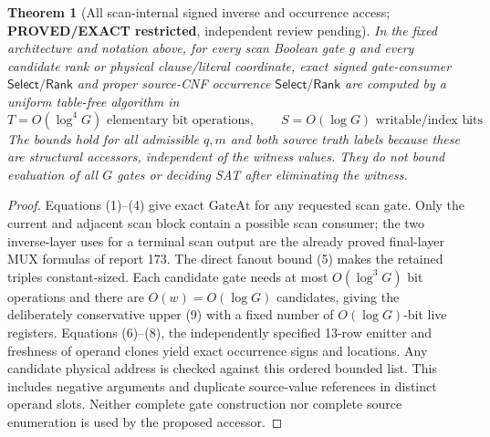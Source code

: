 \documentclass[11pt]{article}
\newtheorem{theorem}{Theorem}
\newcommand{\Select}{\mathsf{Select}}
\newcommand{\Rank}{\mathsf{Rank}}
\begin{document}
\begin{theorem}[All scan-internal signed inverse and occurrence access; \textbf{PROVED/EXACT restricted}, independent review pending]
In the fixed architecture and notation above, for every scan Boolean gate $g$ and every candidate rank or physical clause/literal coordinate, exact signed gate-consumer $\Select/\Rank$ and proper source-CNF occurrence $\Select/\Rank$ are computed by a uniform table-free algorithm in
\[
\boxed{T=O(\log^4G)\text{ elementary bit operations},\qquad
S=O(\log G)\text{ writable/index bits}}.\tag{9}
\]
The bounds hold for all admissible $q,m$ and both source truth labels because these are structural accessors, independent of the witness values. They do \emph{not} bound evaluation of all $G$ gates or deciding SAT after eliminating the witness.
\end{theorem}
\begin{proof}
Equations (1)--(4) give exact $\mathrm{GateAt}$ for any requested scan gate. Only the current and adjacent scan block contain a possible scan consumer; the two inverse-layer uses for a terminal scan output are the already proved final-layer MUX formulas of report 173. The direct fanout bound (5) makes the retained triples constant-sized. Each candidate gate needs at most $O(\log^3G)$ bit operations and there are $O(w)=O(\log G)$ candidates, giving the deliberately conservative upper (9) with a fixed number of $O(\log G)$-bit live registers. Equations (6)--(8), the independently specified 13-row emitter and freshness of operand clones yield exact occurrence signs and locations. Any candidate physical address is checked against this ordered bounded list. This includes negative arguments and duplicate source-value references in distinct operand slots. Neither complete gate construction nor complete source enumeration is used by the proposed accessor.
\end{proof}
\end{document}
